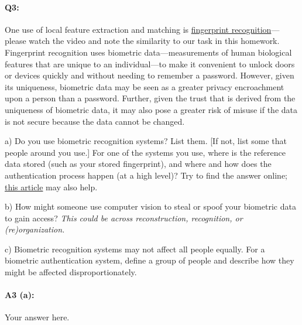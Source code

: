 






\pagebreak
\paragraph{Q3:} One use of local feature extraction and matching is \href{https://www.youtube.com/watch?v=xD88Qs_DZp4}{fingerprint recognition}---please watch the video and note the similarity to our task in this homework. Fingerprint recognition uses biometric data---measurements of human biological features that are unique to an individual---to make it convenient to unlock doors or devices quickly and without needing to remember a password. However, given its uniqueness, biometric data may be seen as a greater privacy encroachment upon a person than a password. Further, given the trust that is derived from the uniqueness of biometric data, it may also pose a greater risk of misuse if the data is not secure because the data cannot be changed.

a) Do you use biometric recognition systems? List them. [If not, list some that people around you use.]
For one of the systems you use, where is the reference data stored (such as your stored fingerprint), and where and how does the authentication process happen (at a high level)? 
Try to find the answer online; \href{https://ievoreader.com/how-biometric-data-is-stored/}{this article} may also help.

b) How might someone use computer vision to steal or spoof your biometric data to gain access? \emph{This could be across reconstruction, recognition, or (re)organization.}

c) Biometric recognition systems may not affect all people equally. For a biometric authentication system, define a group of people and describe how they might be affected disproportionately.

\paragraph{A3 (a):} Your answer here.


